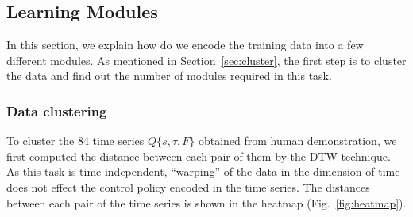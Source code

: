 \documentclass[preprint,12pt]{elsarticle}
\begin{document}







\subsection{Learning Modules}
\label{learning}

In this section, we explain how do we encode the training data into a few different modules. As mentioned in Section~\ref{sec:cluster}, the first step is to cluster the data and find out the number of modules required in this task.

\subsubsection{Data clustering}
To cluster the 84 time series $Q\{s,\tau,F\}$ obtained from human demonstration, we first computed the distance between each pair of them by the DTW technique. As this task is time independent, ``warping'' of the data in the dimension of time does not effect the control policy encoded in the time series. The distances between each pair of the time series is shown in the heatmap (Fig.~\ref{fig:heatmap}).
\end{document}
